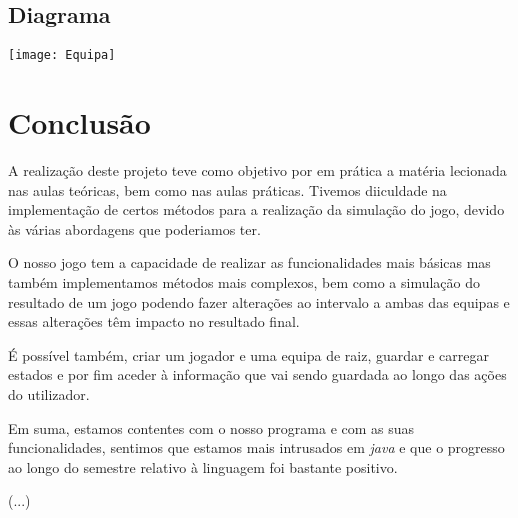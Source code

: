 \documentclass[a4paper,12pt]{article}
\begin{document}
\subsection{Diagrama}
    \begin{center}
        \vspace*{1cm}
        \texttt{[image: Equipa]}
    \end{center}

\newpage

\section{Conclusão}
    A realização deste projeto teve como objetivo por em prática a matéria lecionada nas aulas teóricas, bem como nas
aulas práticas. Tivemos diiculdade na implementação de certos métodos para a realização da simulação do jogo, devido às
várias abordagens que poderiamos ter.\par
    O nosso jogo tem a capacidade de realizar as funcionalidades mais básicas mas também implementamos métodos mais
complexos, bem como a simulação do resultado de um jogo podendo fazer alterações ao intervalo a ambas das equipas
e essas alterações têm impacto no resultado final.\par
    É possível também, criar um jogador e uma equipa de raiz, guardar e carregar estados e por fim aceder à informação
que vai sendo guardada ao longo das ações do utilizador.\par
    Em suma, estamos contentes com o nosso programa e com as suas funcionalidades, sentimos que estamos mais intrusados
    em \emph{java} e que o progresso ao longo do semestre relativo à linguagem foi bastante positivo.


(...)
\end{document}
